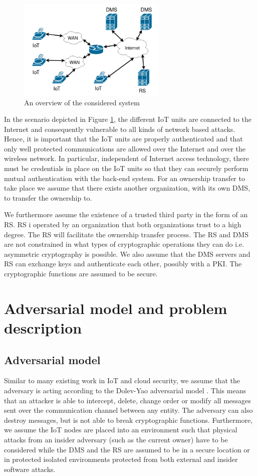 {\begin{figure}
\centering
\includegraphics[width=200pt]{papers/ot/images/ot-fig-1.png}
\caption{An overview of the considered system}
\label{fig:system_0}
\end{figure}

In the scenario depicted in Figure \ref{fig:system_0}, the different IoT units are connected to the Internet and consequently vulnerable to all kinds of network based attacks. Hence, it is important that the IoT units are properly authenticated and that only well protected communications are allowed over the Internet and over the wireless network. In particular, independent of Internet access technology, there must be credentials in place on the IoT units so that they can securely perform mutual authentication with the back-end system. 
For an ownership transfer to take place we assume that there exists another organization, with its own DMS, to transfer the ownership to. 


We furthermore assume the existence of a trusted third party in the form of an RS. RS i operated by an organization that both organizations trust to a high degree. The RS will facilitate the ownership transfer process.
The RS and DMS are not constrained in what types of cryptographic operations they can do i.e. asymmetric cryptography is possible. We also assume that the DMS servers and RS can exchange keys and authenticate each other, possibly with a PKI. The cryptographic functions are assumed to be secure.

\section{Adversarial model and problem description}
\label{threat-model}
\subsection{Adversarial model}
\label{adversary}
Similar to many existing work in IoT and cloud security, we assume that the adversary is acting according to the Dolev-Yao adversarial model \cite{Dolev1981}. This means that an attacker is able to intercept, delete, change order or modify all messages sent over the communication channel between any entity. The adversary can also destroy messages, but is not able to break cryptographic functions. Furthermore, we assume the IoT nodes are placed into an environment such that physical attacks from an insider adversary (such as the current owner) have to be considered while the DMS and the RS are assumed to be in a secure location or in protected isolated environments protected from both external and insider software attacks.

}
